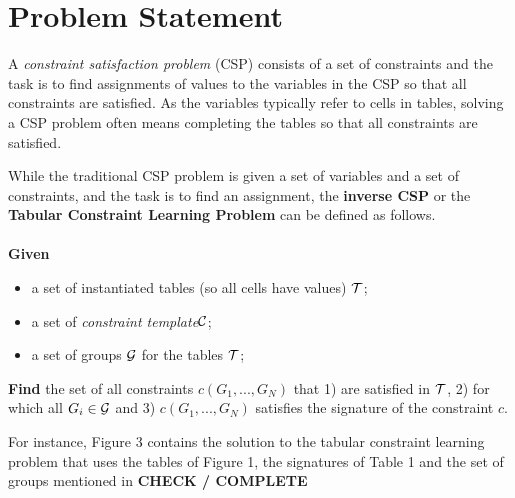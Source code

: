 \documentclass{ecai}
\newcommand{\sergey}[1]{\textcolor{magenta}{{\sc Sergey:} #1}\xspace}
\newcommand{\samuel}[1]{\textcolor{green}{{\sc Samuel:} #1}\xspace}
\newcommand{\format}[1]{\textit{#1}\xspace}
\newcommand{\template}{\format{constraint template}}
\begin{document}

\section{Problem Statement}
A {\em constraint satisfaction problem} (CSP) consists of a set of constraints and the
task is to find assignments of values to the variables in the CSP so that all constraints are satisfied.  As the variables typically refer to
cells in tables, solving a CSP problem often means completing the tables so that all constraints are satisfied.

While the traditional CSP problem is given a set of variables and a set of constraints,
and the task is to find an assignment, the {\bf inverse CSP} or the {\bf Tabular Constraint Learning Problem} can be defined as follows.\\
\\
{\bf Given }
\begin{itemize}
\item
a set of instantiated tables (so all cells have values) ${\cal T}$;
\item
a set of \template ${\cal C}$;
\item
a set of groups ${\cal G}$ for the tables ${\cal T}$;
\end{itemize}
\noindent
{\bf Find}  the set of all constraints $c(G_1, ... , G_N)$ that 1) are satisfied  in ${\cal T}$, 2)
for which all $G_i \in {\cal G}$ and  3)  $c(G_1, ... , G_N)$ satisfies the signature of the constraint $c$.

For instance, Figure 3 contains the solution to the tabular constraint learning problem
that uses the tables of Figure 1, the signatures of Table 1 and the set of groups mentioned in {\bf CHECK / COMPLETE}
\end{document}
